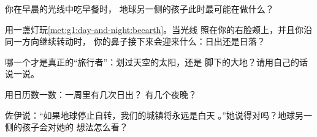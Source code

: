\begin{exercise}[$\star$]\label{exo:g1:day-and-night:5}
你在早晨的光线中吃早餐时，
地球另一侧的孩子此时最可能在做什么？
\end{exercise}

\begin{exercise}[$\star$]\label{exo:g1:day-and-night:6}
用一盏灯玩\cref{met:g1:day-and-night:beearth}。当光线
照在你的右脸颊上，并且你沿同一方向继续转动时，
你的鼻子接下来会迎来什么：日出还是日落？
\end{exercise}

\begin{exercise}[$\star$]\label{exo:g1:day-and-night:7}
哪一个才是真正的“旅行者”：划过天空的太阳，还是
脚下的大地？请用自己的话说一说。
\end{exercise}

\begin{exercise}[$\star$]\label{exo:g1:day-and-night:8}
用日历数一数：一周里有几次日出？
有几个夜晚？
\end{exercise}

\begin{exercise}[$\star\star$]\label{exo:g1:day-and-night:9}
佐伊说：“如果地球停止自转，我们的城镇将永远是白天
。”她说得对吗？地球另一侧的孩子会对她的
想法怎么看？
\end{exercise}

